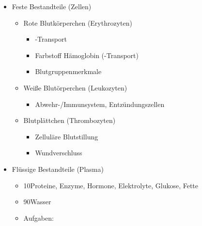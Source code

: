 {
\begin{itemize}
\item Feste Bestandteile (Zellen)
\begin{itemize}
  \item Rote Blutkörperchen (Erythrozyten)
  \begin{itemize}
    \item {}-Transport
    \item Farbstoff Hämoglobin (-Transport)
    \item Blutgruppenmerkmale
  \end{itemize}
  \item Weiße Blutörperchen (Leukozyten)
  \begin{itemize}
    \item Abwehr-/Immunsystem, Entzündungszellen
  \end{itemize}
  \item Blutplättchen (Thrombozyten)
  \begin{itemize}
    \item Zelluläre Blutstillung
    \item Wundverschluss
  \end{itemize}
\end{itemize}
\item Flüssige Bestandteile (Plasma)
\begin{itemize}
    \item 10\PC* Proteine, Enzyme, Hormone, Elektrolyte,
    Glukose, Fette
    \item 90\PC* Wasser
    \item Aufgaben:
\end{itemize}
\end{itemize}
}{}{}{}




